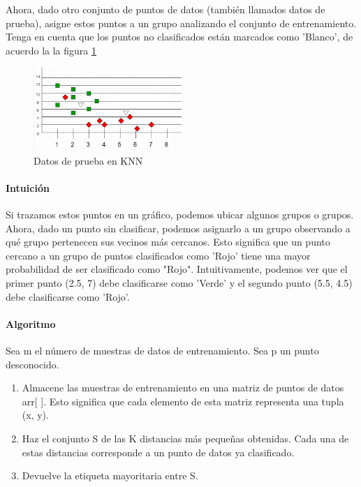 \documentclass{article}
\begin{document}
Ahora, dado otro conjunto de puntos de datos (también llamados datos de prueba), asigne estos puntos a un grupo analizando el conjunto de entrenamiento. Tenga en cuenta que los puntos no clasificados están marcados como 'Blanco', de acuerdo la la figura \ref{fig:knn_02}

\begin{figure}[h!]
	\centering
	\includegraphics[width=0.5\textwidth]{img/knn_02.png}
	\caption{Datos de prueba en KNN}
	\label{fig:knn_02}
\end{figure}

\paragraph{Intuición}
Si trazamos estos puntos en un gráfico, podemos ubicar algunos grupos o grupos. Ahora, dado un punto sin clasificar, podemos asignarlo a un grupo observando a qué grupo pertenecen sus vecinos más cercanos. Esto significa que un punto cercano a un grupo de puntos clasificados como 'Rojo' tiene una mayor probabilidad de ser clasificado como "Rojo".
Intuitivamente, podemos ver que el primer punto (2.5, 7) debe clasificarse como 'Verde' y el segundo punto (5.5, 4.5) debe clasificarse como 'Rojo'.

\paragraph{Algoritmo}
Sea m el número de muestras de datos de entrenamiento. Sea p un punto desconocido.
\begin{enumerate}
	\item Almacene las muestras de entrenamiento en una matriz de puntos de datos arr[ ]. Esto significa que cada elemento de esta matriz representa una tupla (x, y).
	\item Haz el conjunto S de las K distancias más pequeñas obtenidas. Cada una de estas distancias corresponde a un punto de datos ya clasificado.
	\item Devuelve la etiqueta mayoritaria entre S.
\end{enumerate}
\end{document}
